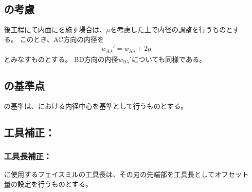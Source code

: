 \subsection{\PlatingThk の考慮}
後工程にて内面に\Plating を施す場合は、\PlatingThk$\mu$を考慮した上で内径の調整を行うものとする。
このとき、AC方向の内径を
\begin{align*}
  w_{\mathrm A\lambda}' = w_{\mathrm A\lambda}+2\mu
\end{align*}
とみなすものとする。
BD方向の内径$w_{\mathrm B\lambda}'$についても同様である。



\clearpage


\subsection{\EndFacecutMilling の基準点}
\EndFacecutMilling の基準は、\nameEndFace における内径中心を基準として行うものとする。


\subsection{工具補正：\EndFacecutMilling}

\subsubsection{工具長補正：\EndFacecutMilling}
\EndFacecutMilling に使用するフェイスミルの工具長は、その刃の先端部を工具長としてオフセット量の設定を行うものとする。

